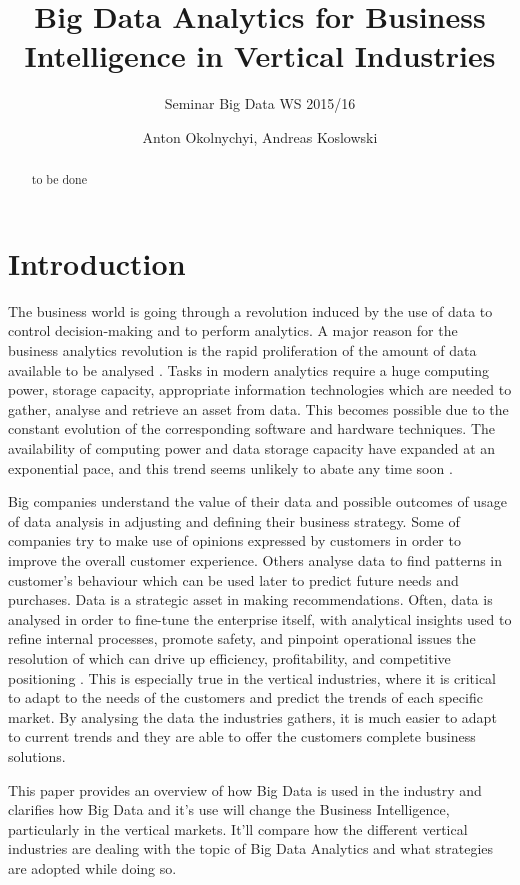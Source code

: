 \documentclass[runningheads]{llncs}
\title{Big Data Analytics for Business Intelligence in Vertical Industries}
\subtitle{Seminar Big Data WS 2015/16}
\author{Anton Okolnychyi, Andreas Koslowski}
\institute{RWTH Aachen University, 52056 Aachen, Germany\\
\{anton.okolnychyi, andreas.koslowski\}@rwth-aachen.de}
\begin{document}
\maketitle

\begin{abstract}
to be done
\end{abstract}

\section{Introduction}
The business world is going through a revolution induced by the use of data to control decision-making and to perform analytics. A major reason for the business analytics revolution is the rapid proliferation of the amount of data available to be analysed \cite{Gopalkrishnan}. Tasks in modern analytics require a huge computing power, storage capacity, appropriate information technologies which are needed to gather, analyse and retrieve an asset from data. This becomes possible due to the constant evolution of the corresponding software and hardware techniques. The availability of computing power and data storage capacity have expanded at an exponential pace, and this trend seems unlikely to abate any time soon \cite{NYTIMES}.  

Big companies understand the value of their data and possible outcomes of usage of data analysis in adjusting and defining their business strategy.  Some of companies try to make use of opinions expressed by customers in order to improve the overall customer experience. Others analyse data to find patterns in customer's behaviour which can be used later to predict future needs and purchases. Data is a strategic asset in making recommendations. Often, data is analysed in order to fine-tune the enterprise itself, with analytical insights used to refine internal processes, promote safety, and pinpoint operational issues the resolution of which can drive up efficiency, profitability, and competitive positioning \cite{Guszcza}.
This is especially true in the vertical industries, where it is critical to adapt to the needs of the customers and predict the trends of each specific market. By analysing the data the industries gathers, it is much easier to adapt to current trends and they are able to offer the customers complete business solutions.

This paper provides an overview of how Big Data is used in the industry and clarifies how Big Data and it's use will change the Business Intelligence, particularly in the vertical markets. It'll compare how the different vertical industries are dealing with the topic of Big Data Analytics and what strategies are adopted while doing so.
\end{document}
